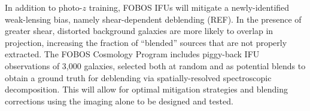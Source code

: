 \documentclass[oneside,11pt]{amsart}
\begin{document}
In addition to photo-$z$ training, FOBOS IFUs will mitigate a newly-identified weak-lensing bias, namely shear-dependent deblending (REF).  In the presence of greater shear, distorted background galaxies are more likely to overlap in projection, increasing the fraction of ``blended'' sources that are not properly extracted.  The FOBOS Cosmology Program includes piggy-back IFU observations of 3,000 galaxies, selected both at random and as potential blends to obtain a ground truth for deblending via spatially-resolved spectroscopic decomposition.  This will allow for optimal mitigation strategies and blending corrections using the imaging alone to be designed and tested.










  
\end{document}
